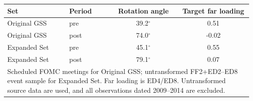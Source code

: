 \begin{tabular}{llcc}
\toprule
Set & Period & Rotation angle & Target far loading \\
\midrule
Original GSS & pre & 39.2$^\circ$ & 0.51 \\
Original GSS & post & 74.0$^\circ$ & -0.02 \\
\midrule
Expanded Set & pre & 45.1$^\circ$ & 0.55 \\
Expanded Set & post & 79.1$^\circ$ & 0.07 \\
\midrule
\multicolumn{4}{p{0.62\linewidth}}{\footnotesize Scheduled FOMC meetings for Original GSS; untransformed FF2+ED2--ED8 event sample for Expanded Set. Far loading is ED4/ED8. Untransformed source data are used, and all observations dated 2009--2014 are excluded.}\\
\bottomrule
\end{tabular}
